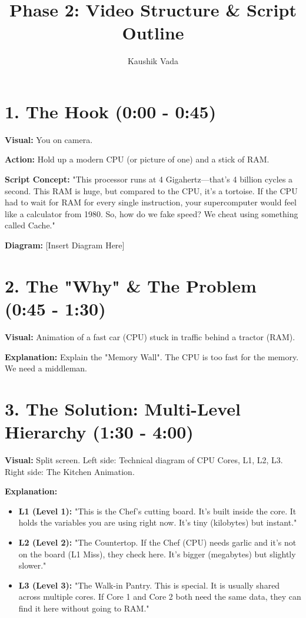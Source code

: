 \documentclass{article}
\title{Phase 2: Video Structure \& Script Outline}
\author{Kaushik Vada}
\date{}
\begin{document}
\maketitle

\section*{1. The Hook (0:00 - 0:45)}
\textbf{Visual:} You on camera.

\textbf{Action:} Hold up a modern CPU (or picture of one) and a stick of RAM.

\textbf{Script Concept:} "This processor runs at 4 Gigahertz—that's 4 billion cycles a second. This RAM is huge, but compared to the CPU, it’s a tortoise. If the CPU had to wait for RAM for every single instruction, your supercomputer would feel like a calculator from 1980. So, how do we fake speed? We cheat using something called Cache."

\textbf{Diagram:} [Insert Diagram Here]

\section*{2. The "Why" \& The Problem (0:45 - 1:30)}
\textbf{Visual:} Animation of a fast car (CPU) stuck in traffic behind a tractor (RAM).

\textbf{Explanation:} Explain the "Memory Wall". The CPU is too fast for the memory. We need a middleman.

\section*{3. The Solution: Multi-Level Hierarchy (1:30 - 4:00)}
\textbf{Visual:} Split screen. Left side: Technical diagram of CPU Cores, L1, L2, L3. Right side: The Kitchen Animation.

\textbf{Explanation:}
\begin{itemize}
    \item \textbf{L1 (Level 1):} "This is the Chef's cutting board. It's built inside the core. It holds the variables you are using right now. It's tiny (kilobytes) but instant."
    \item \textbf{L2 (Level 2):} "The Countertop. If the Chef (CPU) needs garlic and it's not on the board (L1 Miss), they check here. It's bigger (megabytes) but slightly slower."
    \item \textbf{L3 (Level 3):} "The Walk-in Pantry. This is special. It is usually shared across multiple cores. If Core 1 and Core 2 both need the same data, they can find it here without going to RAM."
\end{itemize}
\end{document}
